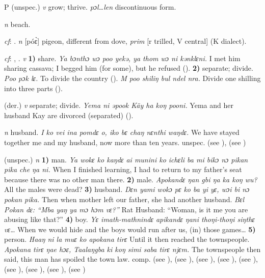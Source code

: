 \begin{letter}{P}
 (unspec.) \textit{v} grow; thrive. \textit{pɔl…len} discontinuous form.

 \textit{n} beach.

 \textit{cf}: . \textit{n} [póɛ̀] pigeon, different from dove, \textit{prim} [r trilled, V central] (K dialect). 

 \textit{cf}: , . \textit{v} \textbf{1)} share. \textit{Ya bɔnthɔ wɔ poo yekə, ya thom wɔ ni kənklɛni.} I met him sharing cassava; I begged him (for some), but he refused (\citealt{Pichl1967}). \textbf{2)} separate; divide. \textit{Poo pɔk lɛ.} To divide the country (\citealt{Pichl1967}). \textit{M poo shiliŋ bul ndel nra.} Divide one shilling into three parts (\citealt{Pichl1967}). 

 (der.) \textit{v} separate; divide. \textit{Yema ni əpook Kãy ha koŋ pooni.} Yema and her husband Kay are divorced (separated) (\citealt{Pichl1967}). 

 \textit{n} husband. \textit{I ko vei ina pomdɛ o, iko bɛ chaŋ nɛnthi waŋdɛ.} We have stayed together me and my husband, now more than ten years. unspec.  (see ),  (see ) 

 (unspec.) \textit{n} \textbf{1)} man. \textit{Ya wokɛ ko kaŋdɛ ai munini ko ichɛli ba mi bikɔ nɔ pikan pika che ŋa ni.} When I finished learning, I had to return to my father's seat because there was no other man there. \textbf{2)} male. \textit{Apokandɛ ŋan gbi ŋa ka koŋ wu?} All the males were dead? \textbf{3)} husband. \textit{Dɛn yami wokɔ pɛ ko ba yi yɛ, wɔi bi nɔ pokan pika.} Then when mother left our father, she had another husband. \textit{Bɛl Pokan dɛ: “Mba yaŋ ya mɔ hɔm vɛ?”} Rat Husband: “Woman, is it me you are abusing like that?” \textbf{4)} boy. \textit{Yɛ imath-mathnindɛ apikandɛ ŋani thoŋi-thoŋi siŋthɛ vɛ…} When we would hide and the boys would run after us, (in) those games… \textbf{5)} person. \textit{Haaŋ ni la muɛ ko apokana tirɛ} Until it then reached the townspeople. \textit{Apokana tirɛ ŋae hɔɛ, Taalaŋgba ki koŋ simi saba tirɛ njɛm.} The townspeople then said, this man has spoiled the town law. comp.  (see ),  (see ),  (see ),  (see ),  (see ),  (see ),  (see ),  (see ),  (see ) 


\end{letter}

